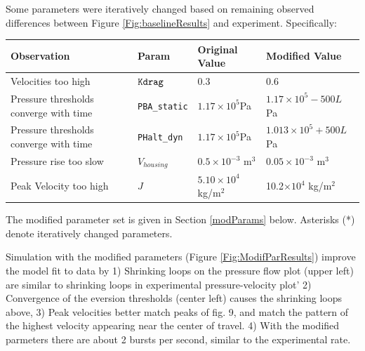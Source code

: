 \documentclass[letterpaper]{article}
\begin{document}
Some parameters were iteratively changed based on remaining observed differences
between Figure \ref{Fig:baselineResults} and experiment. Specifically:

\vspace{0.175in}
\begin{tabular}{p{1.5in}|l|l|l}
Observation       & Param    & Original Value & Modified Value      \\\hline
Velocities too high  & ${\tt Kdrag}$  &   0.3     & 0.6          \\\hline
Pressure thresholds converge with time& {\tt PBA\_static} & $1.17\times10^5 $Pa & $1.17\times10^5 - 500L$ Pa          \\\hline
Pressure thresholds converge with time & {\tt PHalt\_dyn} & $1.17\times10^5 $Pa & $1.013\times10^5 + 500L$ Pa       \\\hline
Pressure rise too slow  & $V_{housing}$   &  $0.5\times10^{-3}$ m$^3$   & $0.05\times10^{-3} $ m$^3$   \\\hline
Peak Velocity too high  & $J$             &  $5.10\times10^4$  kg/m$^2$     & 10.2$\times10^4$  kg/m$^2$ \\\hline
\end{tabular}

\vspace{0.175in}

The modified parameter set is given in Section \ref{modParams} below.  Asterisks (*) denote iteratively changed parameters.

Simulation with the modified parameters (Figure \ref{Fig:ModifParResults}) improve the model fit to data by
    1) Shrinking loops on the pressure flow plot (upper left) are similar
  to shrinking loops in experimental pressure-velocity plot'
    2) Convergence of the eversion thresholds (center left) causes the shrinking loops above,
    3) Peak velocities better match peaks of fig. 9, and match the pattern of the highest velocity
  appearing near the center of travel.
    4) With the modified parmeters there are about 2 bursts per second, similar to the experimental rate.
\end{document}
